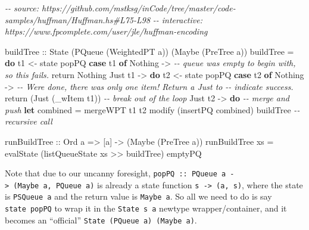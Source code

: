 \documentclass[]{article}
\newenvironment{Shaded}{}{}
\newcommand{\CommentTok}[1]{\textcolor[rgb]{0.38,0.63,0.69}{\textit{#1}}}
\newcommand{\DataTypeTok}[1]{\textcolor[rgb]{0.56,0.13,0.00}{#1}}
\newcommand{\FunctionTok}[1]{\textcolor[rgb]{0.02,0.16,0.49}{#1}}
\newcommand{\KeywordTok}[1]{\textcolor[rgb]{0.00,0.44,0.13}{\textbf{#1}}}
\newcommand{\NormalTok}[1]{#1}
\newcommand{\OperatorTok}[1]{\textcolor[rgb]{0.40,0.40,0.40}{#1}}
\newcommand{\OtherTok}[1]{\textcolor[rgb]{0.00,0.44,0.13}{#1}}
\begin{document}
\begin{Shaded}
\begin{Highlighting}[]
\CommentTok{{-}{-} source: https://github.com/mstksg/inCode/tree/master/code{-}samples/huffman/Huffman.hs\#L75{-}L98}
\CommentTok{{-}{-} interactive: https://www.fpcomplete.com/user/jle/huffman{-}encoding}

\OtherTok{buildTree ::} \DataTypeTok{State}\NormalTok{ (}\DataTypeTok{PQueue}\NormalTok{ (}\DataTypeTok{WeightedPT}\NormalTok{ a)) (}\DataTypeTok{Maybe}\NormalTok{ (}\DataTypeTok{PreTree}\NormalTok{ a))}
\NormalTok{buildTree }\OtherTok{=} \KeywordTok{do}
\NormalTok{    t1\textquotesingle{} }\OtherTok{\textless{}{-}}\NormalTok{ state popPQ}
    \KeywordTok{case}\NormalTok{ t1\textquotesingle{} }\KeywordTok{of}
      \DataTypeTok{Nothing} \OtherTok{{-}\textgreater{}}
        \CommentTok{{-}{-} queue was empty to begin with, so this fails.}
        \FunctionTok{return} \DataTypeTok{Nothing}
      \DataTypeTok{Just}\NormalTok{ t1 }\OtherTok{{-}\textgreater{}} \KeywordTok{do}
\NormalTok{        t2\textquotesingle{} }\OtherTok{\textless{}{-}}\NormalTok{ state popPQ}
        \KeywordTok{case}\NormalTok{ t2\textquotesingle{} }\KeywordTok{of}
          \DataTypeTok{Nothing}  \OtherTok{{-}\textgreater{}}
            \CommentTok{{-}{-} We\textquotesingle{}re done, there was only one item!  Return a \textasciigrave{}Just\textasciigrave{} to}
            \CommentTok{{-}{-} indicate success.}
            \FunctionTok{return}\NormalTok{ (}\DataTypeTok{Just}\NormalTok{ (\_wItem t1))     }\CommentTok{{-}{-} break out of the loop}
          \DataTypeTok{Just}\NormalTok{ t2 }\OtherTok{{-}\textgreater{}} \KeywordTok{do}
            \CommentTok{{-}{-} merge and push}
            \KeywordTok{let}\NormalTok{ combined }\OtherTok{=}\NormalTok{ mergeWPT t1 t2}
\NormalTok{            modify (insertPQ combined)}
\NormalTok{            buildTree                     }\CommentTok{{-}{-} recursive call}

\OtherTok{runBuildTree ::} \DataTypeTok{Ord}\NormalTok{ a }\OtherTok{=\textgreater{}}\NormalTok{ [a] }\OtherTok{{-}\textgreater{}}\NormalTok{ (}\DataTypeTok{Maybe}\NormalTok{ (}\DataTypeTok{PreTree}\NormalTok{ a))}
\NormalTok{runBuildTree xs }\OtherTok{=}\NormalTok{ evalState (listQueueState xs }\OperatorTok{\textgreater{}\textgreater{}}\NormalTok{ buildTree) emptyPQ}
\end{Highlighting}
\end{Shaded}

Note that due to our uncanny foresight,
\texttt{popPQ\ ::\ PQueue\ a\ -\textgreater{}\ (Maybe\ a,\ PQueue\ a)} is
already a state function \texttt{s\ -\textgreater{}\ (a,\ s)}, where the state
is \texttt{PSQueue\ a} and the return value is \texttt{Maybe\ a}. So all we need
to do is say \texttt{state\ popPQ} to wrap it in the \texttt{State\ s\ a}
newtype wrapper/container, and it becomes an ``official''
\texttt{State\ (PQueue\ a)\ (Maybe\ a)}.
\end{document}
